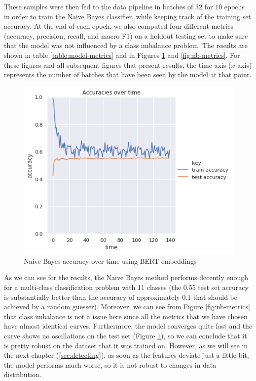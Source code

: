\documentclass[12pt]{extreport}
\begin{document}
These samples were then fed to the data pipeline in batches of $32$ for $10$ epochs in order to train the Naive Bayes classifier, while keeping track of the training set accuracy. At the end of each epoch, we also computed four different metrics (accuracy, precision, recall, and macro F1) on a holdout testing set to make sure that the model was not influenced by a class imbalance problem. The results are shown in table \ref{table:model-metrics} and in Figures \ref{fig:nb-acc} and \ref{fig:nb-metrics}. For these figures and all subsequent figures that present results, the time axis ($x$-axis) represents the number of batches that have been seen by the model at that point.

\begin{figure}[H]
\centering
\includegraphics[width=0.7\linewidth]{assets/framework/nb_BERT_accuracy_holdout.png}
\caption{Naive Bayes accuracy over time using BERT embeddings}
\label{fig:nb-acc}
\end{figure}

As we can see for the results, the Naive Bayes method performs decently enough for a multi-class classification problem with 11 classes (the $0.55$ test set accuracy is substantially better than the accuracy of approximately $0.1$ that should be achieved by a random guesser). Moreover, we can see from Figure \ref{fig:nb-metrics} that class imbalance is not a issue here since all the metrics that we have chosen have almost identical curves. Furthermore, the model converges quite fast and the curve shows no oscillations on the test set (Figure \ref{fig:nb-acc}), so we can conclude that it is pretty robust on the dataset that it was trained on. However, as we will see in the next chapter (\ref{sec:detecting}), as soon as the features deviate just a little bit, the model performs much worse, so it is not robust to changes in data distribution.
\end{document}
